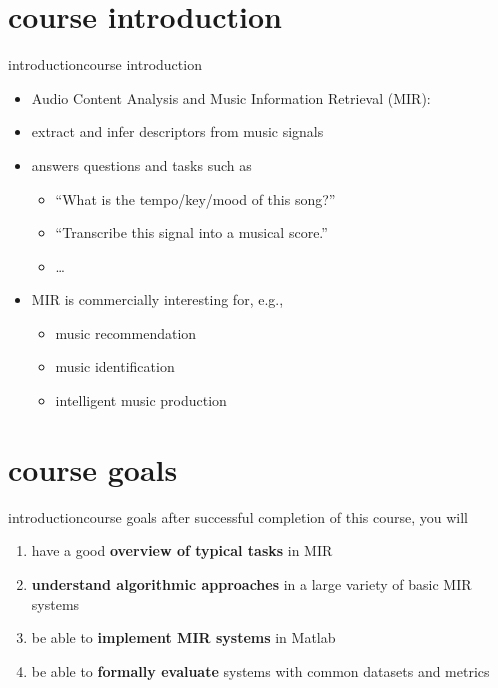     \section[course intro]{course introduction}
        \begin{frame}{introduction}{course introduction}
            \begin{itemize}
                \item   Audio Content Analysis and Music Information Retrieval (MIR):
                \item   extract and infer descriptors from music signals
                \item   answers questions and tasks such as
                    \begin{itemize}
                        \item   ``What is the tempo/key/mood of this song?''
                        \item   ``Transcribe this signal into a musical score.''
                        \item   \ldots
                    \end{itemize}
                \bigskip
                \item<2->   MIR is commercially interesting for, e.g.,
                    \begin{itemize}
                        \item   music recommendation
                        \item   music identification
                        \item   intelligent music production
                    \end{itemize}
            \end{itemize}
        \end{frame}
        
    \section[course goals]{course goals}
        \begin{frame}{introduction}{course goals}
            after successful completion of this course, you will
            \smallskip
            \begin{enumerate}
                \item   have a good \textbf{overview of typical tasks} in MIR
                \item   \textbf{understand algorithmic approaches} in a large variety of basic MIR systems
                \item   be able to \textbf{implement MIR systems} in Matlab
                \item   be able to \textbf{formally evaluate} systems with common datasets and metrics
            \end{enumerate}
        \end{frame}
        
